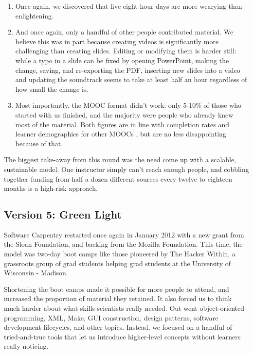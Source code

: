 \documentclass{article}
\begin{document}
\begin{enumerate}
\item
  Once again, we discovered that five eight-hour days are more wearying
  than enlightening.
\item
  And once again, only a handful of other people contributed material.
  We believe this was in part because creating videos is significantly
  more challenging than creating slides. Editing or modifying them is
  harder still: while a typo in a slide can be fixed by opening
  PowerPoint, making the change, saving, and re-exporting the PDF,
  inserting new slides into a video and updating the soundtrack seems to
  take at least half an hour regardless of how small the change is.
\item
  Most importantly, the MOOC format didn't work: only 5-10\% of those
  who started with us finished, and the majority were people who already
  knew most of the material. Both figures are in line with completion
  rates and learner demographics for other MOOCs \cite{jordan2013}, but
  are no less disappointing because of that.
\end{enumerate}

The biggest take-away from this round was the need come up with a
scalable, sustainable model. One instructor simply can't reach enough
people, and cobbling together funding from half a dozen different
sources every twelve to eighteen months is a high-risk approach.

\subsection{Version 5: Green Light}

Software Carpentry restarted once again in January 2012 with a new grant
from the Sloan Foundation, and backing from the Mozilla Foundation. This
time, the model was two-day boot camps like those pioneered by The
Hacker Within, a grassroots group of grad students helping grad students
at the University of Wisconsin - Madison.

Shortening the boot camps made it possible for more people to attend,
and increased the proportion of material they retained. It also forced
us to think much harder about what skills scientists really needed. Out
went object-oriented programming, XML, Make, GUI construction, design
patterns, software development lifecycles, and other topics. Instead, we
focused on a handful of tried-and-true tools that let us introduce
higher-level concepts without learners really noticing.
\end{document}
